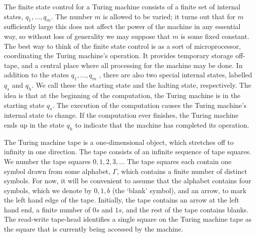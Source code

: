 The finite state control for a Turing machine consists of a finite set of internal states, $q_1,\dots, q_m$. The number $m$ is allowed to be varied; it turns out that for $m$ sufficiently large this does not affect the power of the machine in any essential way, so without loss of generality we may suppose that $m$ is some fixed constant. The best way to think of the finite state control is as a sort of microprocessor, coordinating the Turing machine’s operation. It provides temporary storage off-tape, and a central place where all processing for the machine may be done. In addition to the states $q_1 , \dots , q_m$ , there are also two special internal states, labelled $q_s$ and $q_h$. We call these the starting state and the halting state, respectively. The idea is that at the beginning of the computation, the Turing machine is in the starting state $q_s$. The execution of the computation causes the Turing machine’s internal state to change. If the computation ever finishes, the Turing machine ends up in the state $q_h$ to indicate that the machine has completed its operation.
\vspace{1em}

The Turing machine tape is a one-dimensional object, which stretches off to infinity in one direction. The tape consists of an infinite sequence of tape squares. We number the tape squares $0,1,2,3,\dots$ The tape squares each contain one symbol drawn from some alphabet, $\Gamma$, which contains a finite number of distinct symbols. For now, it will be convenient to assume that the alphabet contains four symbols, which we denote by $0, 1, b$ (the ‘blank’ symbol), and an arrow, to mark the left hand edge of the tape. Initially, the tape contains an arrow at the left hand end, a finite number of $0s$ and $1s$, and the rest of the tape contains blanks. The read-write tape-head identifies a single square on the Turing machine tape as the square that is currently being accessed by the machine.
\vspace{1em}


